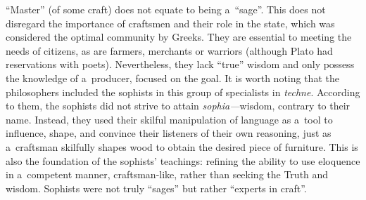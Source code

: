 ``Master'' (of some craft) does not equate to being a~``sage''. This does not disregard the importance of craftsmen and their role in the state, which was considered the optimal community by Greeks. They are essential to meeting the needs of citizens, as are farmers, merchants or warriors (although Plato had reservations with poets). Nevertheless, they lack ``true'' wisdom and only possess the knowledge of a~producer, focused on the goal. It is worth noting that the philosophers included the sophists in this group of specialists in \textit{techne}. According to them, the sophists did not strive to attain \textit{sophia---}wisdom, contrary to their name. Instead, they used their skilful manipulation of language as a~tool to influence, shape, and convince their listeners of their own reasoning, just as a~craftsman skilfully shapes wood to obtain the desired piece of furniture. This is also the foundation of the sophists' teachings: refining the ability to use eloquence in a~competent manner, craftsman-like, rather than seeking the Truth and wisdom. Sophists were not truly ``sages'' but rather ``experts in craft''.



